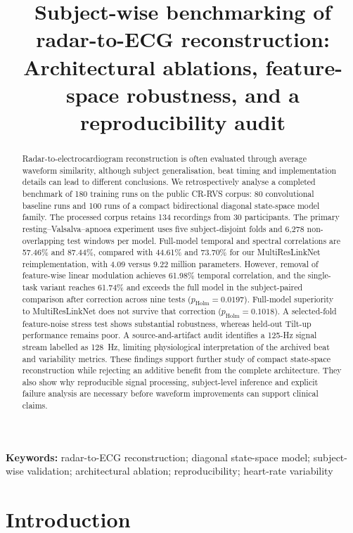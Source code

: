 \documentclass[11pt,a4paper]{article}
\title{Subject-wise benchmarking of radar-to-ECG reconstruction:\\
Architectural ablations, feature-space robustness, and a reproducibility audit}
\author{}
\date{}
\begin{document}
\maketitle
\vspace{-8mm}

\begin{abstract}
Radar-to-electrocardiogram reconstruction is often evaluated through average waveform similarity,
although subject generalisation, beat timing and implementation details can lead to different
conclusions. We retrospectively analyse a completed benchmark of 180 training runs on the public
CR-RVS corpus: 80 convolutional baseline runs and 100 runs of a compact bidirectional diagonal
state-space model family. The processed corpus retains 134 recordings from 30 participants.
The primary resting--Valsalva--apnoea experiment uses five subject-disjoint folds and 6,278
non-overlapping test windows per model. Full-model temporal and spectral correlations are
57.46\% and 87.44\%, compared with 44.61\% and 73.70\% for our MultiResLinkNet reimplementation,
with 4.09 versus 9.22 million parameters. However, removal of feature-wise linear modulation
achieves 61.98\% temporal correlation, and the single-task variant reaches 61.74\% and exceeds
the full model in the subject-paired comparison after correction across nine tests
($p_{\mathrm{Holm}}=0.0197$). Full-model superiority to MultiResLinkNet does not survive that
correction ($p_{\mathrm{Holm}}=0.1018$). A selected-fold feature-noise stress test shows substantial
robustness, whereas held-out Tilt-up performance remains poor. A source-and-artifact audit
identifies a 125-Hz signal stream labelled as 128~Hz, limiting physiological interpretation of
the archived beat and variability metrics. These findings support further study of compact
state-space reconstruction while rejecting an additive benefit from the complete architecture.
They also show why reproducible signal processing, subject-level inference and explicit
failure analysis are necessary before waveform improvements can support clinical claims.
\end{abstract}

\noindent\textbf{Keywords:} radar-to-ECG reconstruction; diagonal state-space model;
subject-wise validation; architectural ablation; reproducibility; heart-rate variability

\section{Introduction}
\end{document}
